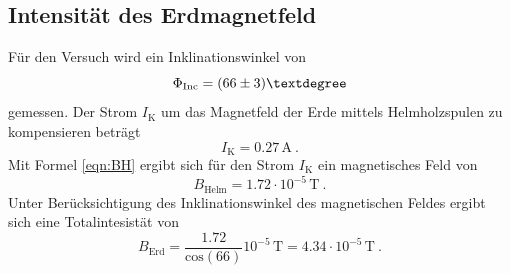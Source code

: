 \subsection{Intensität des Erdmagnetfeld}
Für den Versuch wird ein Inklinationswinkel von
\begin{equation}
  \Phi_\text{Inc} = (\num{66 +-3})°
  \label{eqn:Inc}
\end{equation}
gemessen. Der Strom $I_\text{K}$ um das Magnetfeld der Erde mittels Helmholzspulen zu kompensieren beträgt
\begin{equation}
  I_\text{K} = 0.27 \, \text{A} \ .
  \label{IK}
\end{equation}
Mit Formel \eqref{eqn:BH} ergibt sich für den Strom $I_\text{K}$ ein magnetisches Feld von
\begin{equation}
  B_\text{Helm} = 1.72 \cdot 10^{-5} \, \text{T} \ .
  \label{eqn:Binc}
\end{equation}
Unter Berücksichtigung des Inklinationswinkel des magnetischen Feldes ergibt sich eine Totalintesistät von
\begin{equation}
  B_\text{Erd} = \frac{1.72}{\text{cos}(66)} 10^{-5} \, \text{T} = 4.34 \cdot 10^{-5} \, \text{T} \ .
  \label{eqn:Berd}
\end{equation}
